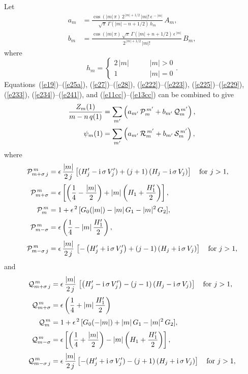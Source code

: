 \documentclass[12pt,prb,aps]{revtex4-1}
\begin{document}
Let 
\begin{align}
a_m &= \frac{\cos(|m|\,\pi)\,2^{\,|m|+1/2}\,|m|!\,\epsilon^{\,-|m|}}{\sqrt{\pi}\,\Gamma(|m|-n+1/2)\,h_m}\,A_m,\label{e11cc}\\[0.5ex]
b_m &= \frac{\cos(|m|\,\pi)\,\sqrt{\pi}\,\Gamma(|m|+n+1/2)\,\epsilon^{\,|m|}}{2^{\,|m|+1/2}\,|m|!}\,B_m,\label{e13cc}
\end{align}
where
\begin{equation}
h_m = \left\{\begin{array}{ccc}2\,|m|&~~~~~~&\mbox{$|m|>0$}\\[0.5ex]
1&&\mbox{$|m|=0$}\end{array}\right..
\end{equation}
Equations~(\ref{e19})--(\ref{e25a}), (\ref{e27})--(\ref{e28}), (\ref{e222})--(\ref{e223}), (\ref{e225})--(\ref{e229}), (\ref{e233}),  (\ref{e234})--(\ref{e241}),
and (\ref{e11cc})--(\ref{e13cc}) 
can be combined to give
\begin{align}
\frac{Z_m(1)}{m-n\,q(1)} &= \sum_{m'}\left(a_{m'}\,{\cal P}_m^{\,m'} + b_{m'}\,{\cal Q}_{m}^{\,m'}\right),\label{e27cc}\\[0.5ex]
\psi_m(1)& = \sum_{m'}\left(a_{m'}\,{\cal R}_m^{\,m'} + b_{m'}\,{\cal S}_{m}^{\,m'}\right),\label{e54cc}
\end{align}
where\,\cite{am1}
\begin{align}
{\cal P}_{m+\sigma\,j}^{\,m}  &=\epsilon\,\frac{|m|}{2\,j}\left[(H_j'-{\rm i}\,\sigma\,V_j')+(j+1)\left(H_j-{\rm i}\,\sigma\,V_j\right)\right]\mbox{~~~for $j>1$},\\[0.5ex]
{\cal P}_{m+\sigma}^{\,m} &=\epsilon\left[\left(\frac{1}{4}-\frac{|m|}{2}\right)+|m|\left(H_1+\frac{H_1'}{2}\right)\right],\\[0.5ex]
{\cal P}_m^{\,m}  &= 1+\epsilon^{\,2}\,[G_0 (|m|)- |m|\,G_1- |m|^2\,G_2],\\[0.5ex]
{\cal P}_{m-\sigma}^{\,m} &= \epsilon\left(\frac{1}{4}- |m|\,\frac{H_1'}{2}\right),\\[0.5ex]
{\cal P}_{m-\sigma\,j}^{\,m} &= \epsilon\,\frac{|m|}{2\,j}\,\left[-\left(H_j'+{\rm i}\,\sigma\,V_j'\right)+(j-1)\left(
H_j+{\rm i}\,\sigma\,V_j\right)\right]\mbox{~~~for $j>1$},
\end{align}
and 
\begin{align}
{\cal Q}_{m+\sigma\,j}^{\,m} &=\epsilon\,\frac{|m|}{2\,j}\,\left[\left(H_j'-{\rm i}\,\sigma\,V_j'\right)-(j-1)\left(
H_j-{\rm i}\,\sigma\,V_j\right)\right]\mbox{~~~for $j>1$}, \\[0.5ex]
{\cal Q}_{m+\sigma}^{\,m} &=\epsilon\left(\frac{1}{4}+ |m|\,\frac{H_1'}{2}\right)\\[0.5ex]
{\cal Q}_m^{\,m} &= 1+\epsilon^{\,2}\,[G_0 (-|m|)+ |m|\,G_1- |m|^2\,G_2],\\[0.5ex]
{\cal Q}_{m-\sigma}^{\,m} &=\epsilon\left[\left(\frac{1}{4}+\frac{|m|}{2}\right)-|m|\left(H_1+\frac{H_1'}{2}\right)\right], \\[0.5ex]
{\cal Q}_{m-\sigma\,j}^{\,m} &=  \epsilon\,\frac{|m|}{2\,j}\left[-(H_j'+{\rm i}\,\sigma\,V_j')-(j+1)\left(H_j+{\rm i}\,\sigma\,V_j\right)\right]\mbox{~~~for $j>1$},
\end{align}
\end{document}
